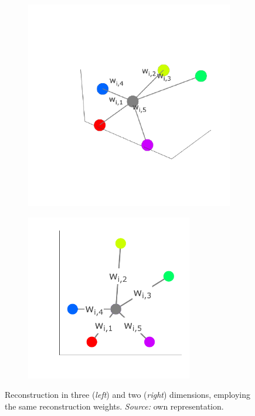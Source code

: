 \begin{figure}[H]
 \centering
 \begin{subfigure}[b]{0.48\textwidth}
   \centering
   \includegraphics[trim = 40 50 20 20, clip, %
   width = \textwidth]{figures/reconstruction-3d}
 \end{subfigure}
 \hfill
 \begin{subfigure}[b]{0.48\textwidth}
   \centering
   \includegraphics[trim = 20 30 0 20, clip, %
   width = 0.8\textwidth]{figures/reconstruction-2d}
 \end{subfigure}
  \caption[Linear reconstruction in LLE]{Reconstruction in three (\textit{left}) 
  and two (\textit{right}) 
  dimensions, employing the same reconstruction weights. \textit{Source:} own
  representation.}
  \label{fig-reconstruction}
\end{figure}

